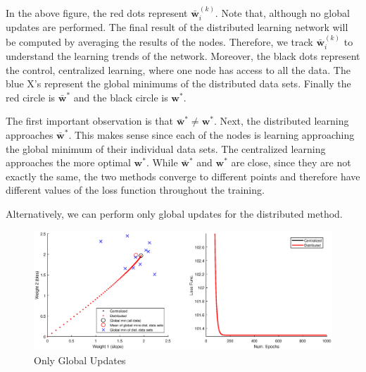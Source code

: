 \documentclass[11pt, fullpage,letterpaper]{article}
\begin{document}
\begin{enumerate}
\begin{enumerate}
In the above figure, the red dots represent $\bar{\boldsymbol{w}}_i^{(k)}$. Note that, although no global updates are performed. The final result of the distributed learning network will be computed by averaging the results of the nodes. Therefore, we track $\bar{\boldsymbol{w}}_i^{(k)}$ to understand the learning trends of the network. Moreover, the black dots represent the control, centralized learning, where one node has access to all the data. The blue X's represent the global minimums of the distributed data sets. Finally the red circle is  $\bar{\boldsymbol{w}}^*$ and the black circle is $\boldsymbol{w}^*$.

The first important observation is that $\bar{\boldsymbol{w}}^*\neq\boldsymbol{w}^*$. Next, the distributed learning approaches $\bar{\boldsymbol{w}}^*$. This makes sense since each of the nodes is learning approaching the global minimum of their individual data sets. The centralized learning approaches the more optimal $\boldsymbol{w}^*$. While $\bar{\boldsymbol{w}}^*$ and $\boldsymbol{w}^*$ are close, since they are not exactly the same, the two methods converge to different points and therefore have different values of the loss function throughout the training.

Alternatively, we can perform only global updates for the distributed method.

\begin{figure}[H]
\begin{center}
\advance\leftskip-3cm
\advance\rightskip-3cm
\includegraphics[width=20cm]{GlobalUpdates.eps}
\caption{Only Global Updates}
\end{center}\end{figure}


\end{enumerate}
\end{enumerate}
\end{document}
